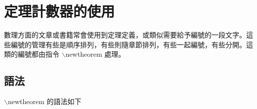 %
%
%
%
%
\chapter{定理計數器的使用}
數理方面的文章或書籍常會使用到定理定義，或類似需要給予編號的一段文字。這些編號的管理有些是順序排列，有些則隨章節排列，有些一起編號，有些分開。這類的編號都由指令 {\C $\backslash$newtheorem} 處理。  

\section{{\MB 語法}}
{\C $\backslash$newtheorem} 的語法如下

